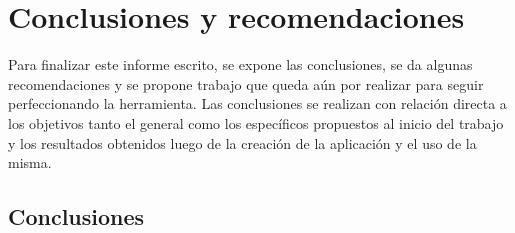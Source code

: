 \chapter{Conclusiones y recomendaciones}

Para finalizar este informe escrito, se expone las conclusiones, se da algunas recomendaciones y se propone trabajo que queda aún por realizar para seguir perfeccionando la herramienta. Las conclusiones se realizan con relación directa a los objetivos tanto el general como los específicos propuestos al inicio del trabajo y los resultados obtenidos luego de la creación de la aplicación y el uso de la misma.

\section*{Conclusiones}

